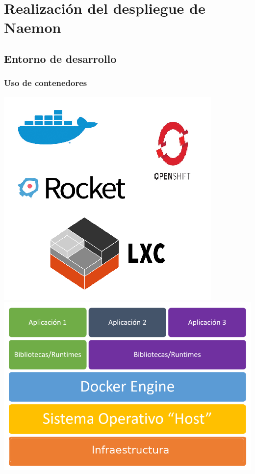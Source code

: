 \documentclass{beamer}
\theoremstyle{plain}
\theoremstyle{definition}
\theoremstyle{plain}
\theoremstyle{definition}
\theoremstyle{remark}
\theoremstyle{definition}
\begin{document}
\section{Realización del despliegue de Naemon} %


\subsection{Entorno de desarrollo}
\begin{frame}
	\frametitle{Uso de contenedores}
	\centering	
	\includegraphics[scale=0.4]{imagenes/comparativaContenedores.png}
	\includegraphics[scale=0.3]{imagenes/contenedores.png}
	
\end{frame}
\end{document}
